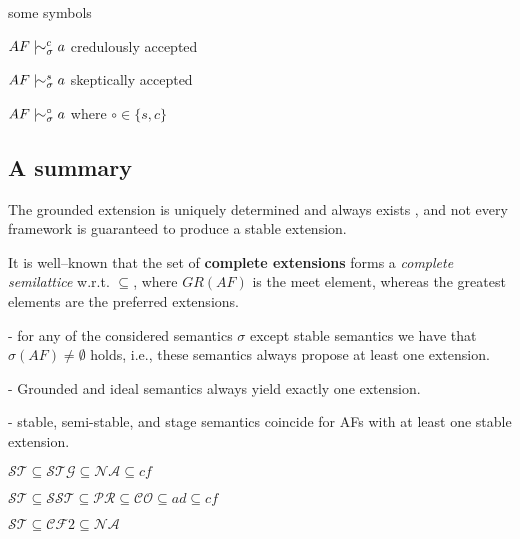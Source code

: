 \noindent\dotfill some symbols \noindent\dotfill


$AF \;|\hspace{-1ex}\sim^c_\sigma a$ credulously accepted

$AF \;|\hspace{-1ex}\sim^s_\sigma a$ skeptically accepted

$AF \;|\hspace{-1ex}\sim^\circ_\sigma a$  where $\circ \in \{s,c\}$




\newpage
{}
\subsection{A summary}



The grounded extension is uniquely determined and always exists \cite{Dun1995},
and not every framework is guaranteed to produce a stable extension.

It is well--known that
the set of \textbf{complete extensions} forms a {\color{teal} \textit{complete semilattice}} w.r.t. $\subseteq$, 
where $GR(AF)$ is the meet element, 
whereas the greatest elements are the preferred extensions.

\dotfill

- for any of the considered semantics $\sigma$ except stable semantics we have that $\sigma(AF) \not= \emptyset$ holds, 
i.e., these semantics always propose at least one extension.

- Grounded and ideal semantics always yield exactly one extension.

-  stable, semi-stable, and stage semantics coincide for AFs with at least one stable extension.

$\mathcal{ST} \subseteq \mathcal{STG} \subseteq \mathcal{NA} \subseteq cf$

$\mathcal{ST} \subseteq \mathcal{SST} \subseteq \mathcal{PR} \subseteq \mathcal{CO} \subseteq ad \subseteq cf$

$\mathcal{ST} \subseteq \mathcal{CF}2 \subseteq \mathcal{NA}$




